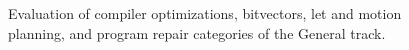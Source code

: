 \begin{figure}
	\noindent{}
	\caption{Evaluation of compiler optimizations, bitvectors, let and motion planning,
			 and program repair categories of the General track.}
	\label{fig:let-mot-plan}
\end{figure}

